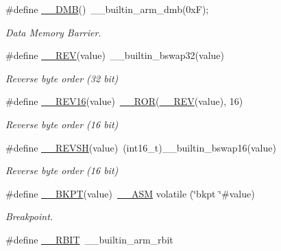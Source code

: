 \begin{DoxyCompactItemize}
\#define \mbox{\hyperlink{group___c_m_s_i_s___core___instruction_interface_ga671101179b5943990785f36f8c1e2269}{\+\_\+\+\_\+\+D\+MB}}()~\+\_\+\+\_\+builtin\+\_\+arm\+\_\+dmb(0x\+F);
\begin{DoxyCompactList}\small\item\em Data Memory Barrier. \end{DoxyCompactList}\item 
\#define \mbox{\hyperlink{group___c_m_s_i_s___core___instruction_interface_gaca25a02e09983da5558f5242f2f635bc}{\+\_\+\+\_\+\+R\+EV}}(value)~\+\_\+\+\_\+builtin\+\_\+bswap32(value)
\begin{DoxyCompactList}\small\item\em Reverse byte order (32 bit) \end{DoxyCompactList}\item 
\#define \mbox{\hyperlink{group___c_m_s_i_s___core___instruction_interface_gad35497777af37e7809271b5e6f9510ba}{\+\_\+\+\_\+\+R\+E\+V16}}(value)~\mbox{\hyperlink{cmsis__iccarm_8h_a7105032649bf6158d4d2d5dc38a3f94c}{\+\_\+\+\_\+\+R\+OR}}(\mbox{\hyperlink{group___c_m_s_i_s___core___instruction_interface_gadb92679719950635fba8b1b954072695}{\+\_\+\+\_\+\+R\+EV}}(value), 16)
\begin{DoxyCompactList}\small\item\em Reverse byte order (16 bit) \end{DoxyCompactList}\item 
\#define \mbox{\hyperlink{group___c_m_s_i_s___core___instruction_interface_gae580812686119c9c5cf3c11a7519a404}{\+\_\+\+\_\+\+R\+E\+V\+SH}}(value)~(int16\+\_\+t)\+\_\+\+\_\+builtin\+\_\+bswap16(value)
\begin{DoxyCompactList}\small\item\em Reverse byte order (16 bit) \end{DoxyCompactList}\item 
\#define \mbox{\hyperlink{group___c_m_s_i_s___core___instruction_interface_ga15ea6bd3c507d3e81c3b3a1258e46397}{\+\_\+\+\_\+\+B\+K\+PT}}(value)~\mbox{\hyperlink{cmsis__iccarm_8h_a1378040bcf22428955c6e3ce9c2053cd}{\+\_\+\+\_\+\+A\+SM}} volatile (\char`\"{}bkpt \char`\"{}\#value)
\begin{DoxyCompactList}\small\item\em Breakpoint. \end{DoxyCompactList}\item 
\#define \mbox{\hyperlink{group___c_m_s_i_s___core___instruction_interface_gab83768933a612816fad669db5488366f}{\+\_\+\+\_\+\+R\+B\+IT}}~\+\_\+\+\_\+builtin\+\_\+arm\+\_\+rbit

\end{DoxyCompactItemize}
